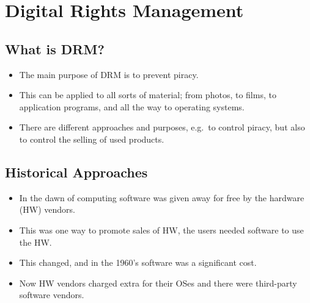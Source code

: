 \mode*




\section{Digital Rights Management}

\subsection{What is DRM?}

\begin{frame}
  \begin{itemize}
    \item The main purpose of DRM is to prevent piracy.

    \item This can be applied to all sorts of material; from photos, to films, 
      to application programs, and all the way to operating systems.

    \item There are different approaches and purposes, e.g.\ to control piracy, 
      but also to control the selling of used products.

  \end{itemize}
\end{frame}

\subsection{Historical Approaches}

\begin{frame}
  \begin{itemize}
    \item In the dawn of computing software was given away for free by the 
      hardware (HW) vendors.

    \item This was one way to promote sales of HW, the users needed software to 
      use the HW\@.

    \item This changed, and in the 1960's software was a significant cost.

    \item Now HW vendors charged extra for their OSes and there were 
      third-party software vendors.
  \end{itemize}
\end{frame}

